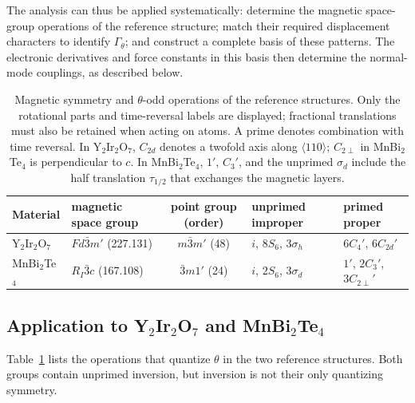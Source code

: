 \documentclass[galley,aps,pra,10pt,amsmath,amssymb,
    superscriptaddress,nofootinbib,longbibliography]{revtex4-2}
\def\Red#1{\textcolor{red}{#1}}
\newcounter{comm}
\newcommand{\seclab}[1]{\label{sec:#1}{\Red{\small\;\;[sec:~#1]}}}
\newcommand{\seclab}[1]{\label{sec:#1}}
\newcommand{\MBT}{MnBi$_2$Te$_4$}
\newcommand{\YIO}{Y$_2$Ir$_2$O$_7$}
\begin{document}
The analysis can thus be applied systematically: determine the magnetic space-group operations of the reference structure; match their required displacement characters to identify $\Gamma_\theta$; and construct a complete basis of these patterns. The electronic derivatives and force constants in this basis then determine the normal-mode couplings, as described below.


\begin{table}[t]
\caption{Magnetic symmetry and $\theta$-odd operations of the reference structures. Only the rotational parts and time-reversal labels are displayed; fractional translations must also be retained when acting on atoms. A prime denotes combination with time reversal. In \YIO{}, $C_{2d}$ denotes a twofold axis along $\langle110\rangle$; $C_{2\perp}$ in \MBT{} is perpendicular to $c$. In \MBT{}, $1'$, $C_3'$, and the unprimed $\sigma_d$ include the half translation $\tau_{1/2}$ that exchanges the magnetic layers.}
\label{tab:theta-odd}
\begin{ruledtabular}
\begin{tabular}{@{}llcll@{}}
Material & magnetic space group & point group (order)
& unprimed improper & primed proper \\
\hline
\YIO{} & $Fd\bar3m'$ (227.131)
& $m\bar3m'$ (48)
& $i$, $8S_6$, $3\sigma_h$
& $6C_4'$, $6C_{2d}'$ \\
\MBT{} & $R_I\bar3c$ (167.108)
& $\bar3m1'$ (24)
& $i$, $2S_6$, $3\sigma_d$
& $1'$, $2C_3'$, $3C_{2\perp}'$ \\
\end{tabular}
\end{ruledtabular}
\end{table}

\subsection{Application to \texorpdfstring{\YIO{} and \MBT{}}{Y2Ir2O7 and MnBi2Te4}}
\seclab{application}

Table~\ref{tab:theta-odd} lists the operations that quantize $\theta$ in the two reference structures. Both groups contain unprimed inversion, but inversion is not their only quantizing symmetry.
\end{document}
